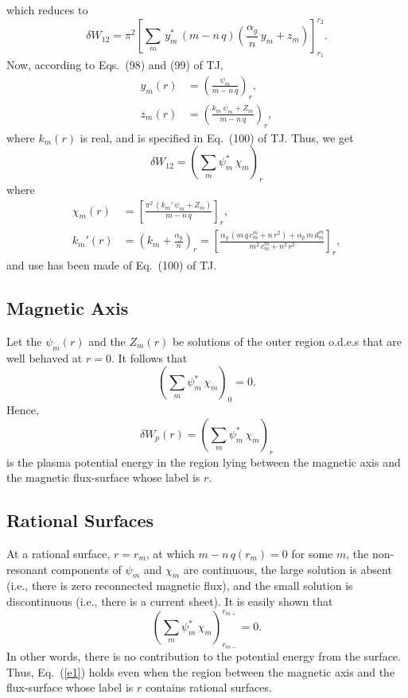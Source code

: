 \documentclass[12pt,prb,aps,notitlepage]{revtex4-1}
\begin{document}
which reduces to
\begin{equation}
\delta W_{12}= \pi^2\left[\sum_m\,y_m^\ast\,(m-n\,q)\left(\frac{\alpha_g}{n}\,y_m+z_m\right)\right]_{r_1}^{r_2}.
\end{equation}
Now, according to Eqs.~(98) and (99) of TJ, 
\begin{align}\label{epsi}
y_m(r) &= \left(\frac{\psi_m}{m-n\,q}\right)_r,\\[0.5ex]
z_m(r)&= \left(\frac{k_m\,\psi_m+Z_m}{m-n\,q}\right)_r,
\end{align}
where
$k_m(r)$ is real, and is specified in Eq.~(100) of TJ. Thus, we get 
\begin{equation}
\delta W_{12}=\left(\sum_m\psi_m^\ast\,\chi_m\right)_r
\end{equation}
where
\begin{align}\label{e29}
\chi_m(r)&=
 \left[\frac{\pi^2\,(k_m'\,\psi_m+Z_m)}{m-n\,q}\right]_r,\\[0.5ex]
k_m'(r) &=\left( k_m + \frac{\alpha_g}{n} \right)_r= \left[\frac{\alpha_g\,(m\,q\,c_m^m+n\,r^2)+\alpha_p\,m\,d_m^m}{m^2\,c_m^m+n^2\,r^2}\right]_r,\label{e30}
\end{align}
and use has been made of Eq.~(100) of TJ. 

\subsection{Magnetic Axis}
Let the $\psi_m(r)$ and the $Z_m(r)$ be solutions of the outer region o.d.e.s that are well behaved at $r=0$. It follows that
\begin{equation}
\left(\sum_m\psi_m^\ast\,\chi_m\right)_{0}=0.
\end{equation}
Hence, 
\begin{equation}\label{e1}
\delta W_p(r) =\left(\sum_m\psi_m^\ast\,\chi_m\right)_r
\end{equation}
is the plasma potential energy in the region lying between the magnetic axis and the magnetic flux-surface whose label is $r$. 

\subsection{Rational Surfaces}
At a rational surface, $r=r_m$, at which $m-n\,q(r_m)=0$ for some $m$, the non-resonant components of $\psi_m$ and $\chi_m$ are continuous, the 
large solution is absent (i.e., there is zero reconnected magnetic flux), and the small solution is discontinuous (i.e., there is a current sheet). It is easily shown that 
\begin{equation}
\left(\sum_m\psi_m^\ast\,\chi_m\right)_{r_{m-}}^{r_{m+}}=0.
\end{equation}
In other words, there is no contribution to the potential energy from the surface. Thus, Eq.~(\ref{e1}) holds even when the region between the
magnetic axis and the flux-surface whose label is $r$ contains rational surfaces. 
\end{document}
